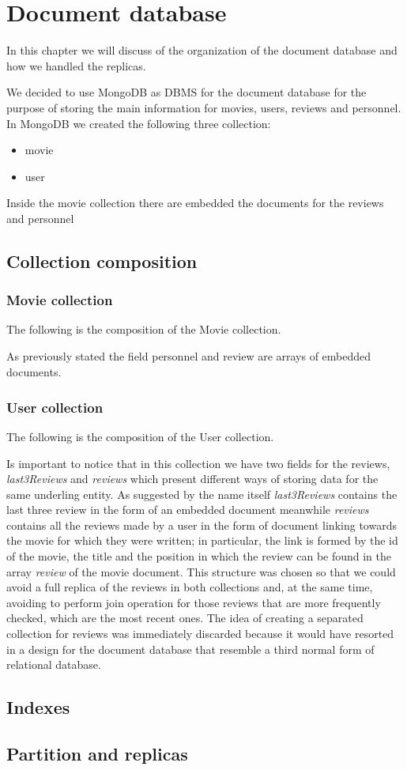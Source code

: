 

\chapter{Document database}
\justifying
In this chapter we will discuss of the organization of the document database and how we handled the replicas.

We decided to use MongoDB as DBMS for the document database for the purpose of storing the main information for movies, users, reviews and personnel. In MongoDB we created the following three collection: 
\begin{itemize}
	\item movie
	\item user
\end{itemize}
Inside the movie collection there are embedded the documents for the reviews and personnel
\section{Collection composition}
\subsection{Movie collection}
The following is the composition of the Movie collection.

As previously stated the field personnel and review are arrays of embedded documents.
\paragraph{}
\subsection{User collection}
The following is the composition of the User collection.

Is important to notice that in this collection we have two fields for the reviews, \emph{last3Reviews} and \emph{reviews} which present different ways of storing data for the same underling entity. As suggested by the name itself \emph{last3Reviews} contains the last three review in the form of an embedded document meanwhile \emph{reviews} contains all the reviews made by a user in the form of document linking towards the movie for which they were written; in particular, the link is formed by the id of the movie, the title and the position in which the review can be found in the array \emph{review} of the movie document. This structure was chosen so that we could avoid a full replica of the reviews in both collections and, at the same time, avoiding to perform join operation for those reviews that are more frequently checked, which are the most recent ones. The idea of creating a separated collection for reviews was immediately discarded because it would have resorted in a design for the document database that resemble a third normal form of relational database.

\section{Indexes}
\blindtext
\section{Partition and replicas}
\blindtext
